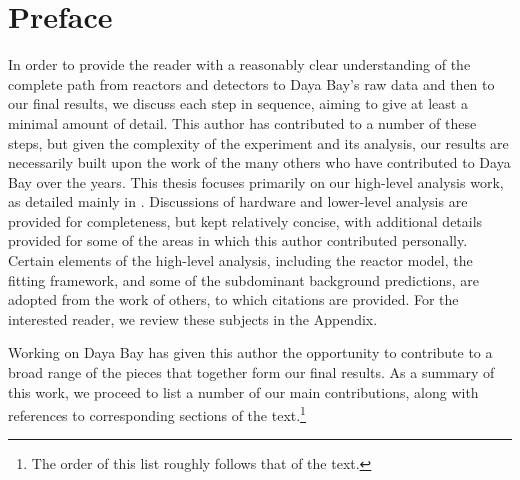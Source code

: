 \documentclass[../thesis.tex]{subfiles}
\begin{document}
\chapter*{Preface}

In order to provide the reader with a reasonably clear understanding of the complete path from reactors and detectors to Daya Bay's raw data and then to our final results, we discuss each step in sequence, aiming to give at least a minimal amount of detail. This author has contributed to a number of these steps, but given the complexity of the experiment and its analysis, our results are necessarily built upon the work of the many others who have contributed to Daya Bay over the years. This thesis focuses primarily on our high-level analysis work, as detailed mainly in . Discussions of hardware and lower-level analysis are provided for completeness, but kept relatively concise, with additional details provided for some of the areas in which this author contributed personally. Certain elements of the high-level analysis, including the reactor model, the fitting framework, and some of the subdominant background predictions, are adopted from the work of others, to which citations are provided. For the interested reader, we review these subjects in the Appendix.


Working on Daya Bay has given this author the opportunity to contribute to a broad range of the pieces that together form our final results. As a summary of this work, we proceed to list a number of our main contributions, along with references to corresponding sections of the text.\footnote{The order of this list roughly follows that of the text.}
\end{document}
